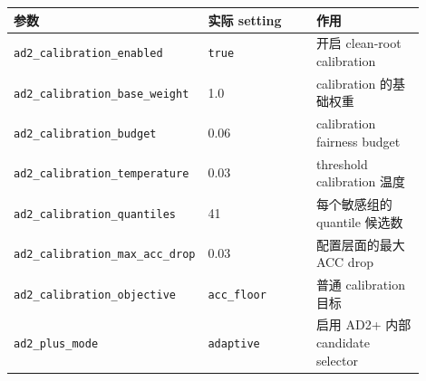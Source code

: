 \documentclass[UTF8,a4paper,10pt]{ctexart}
\begin{document}
{\small
\renewcommand{\arraystretch}{1.18}
\begin{longtable}{|p{0.300\linewidth}|p{0.300\linewidth}|p{0.300\linewidth}|}
\hline
参数 & 实际 setting & 作用 \\\hline
\endhead
\texttt{ad2\_calibration\_enabled} & \texttt{true} & 开启 clean-root calibration \\\hline
\texttt{ad2\_calibration\_base\_weight} & 1.0 & calibration 的基础权重 \\\hline
\texttt{ad2\_calibration\_budget} & 0.06 & calibration fairness budget \\\hline
\texttt{ad2\_calibration\_temperature} & 0.03 & threshold calibration 温度 \\\hline
\texttt{ad2\_calibration\_quantiles} & 41 & 每个敏感组的 quantile 候选数 \\\hline
\texttt{ad2\_calibration\_max\_acc\_drop} & 0.03 & 配置层面的最大 ACC drop \\\hline
\texttt{ad2\_calibration\_objective} & \texttt{acc\_floor} & 普通 calibration 目标 \\\hline
\texttt{ad2\_plus\_mode} & \texttt{adaptive} & 启用 AD2+ 内部 candidate selector \\\hline
\end{longtable}
}
\end{document}
